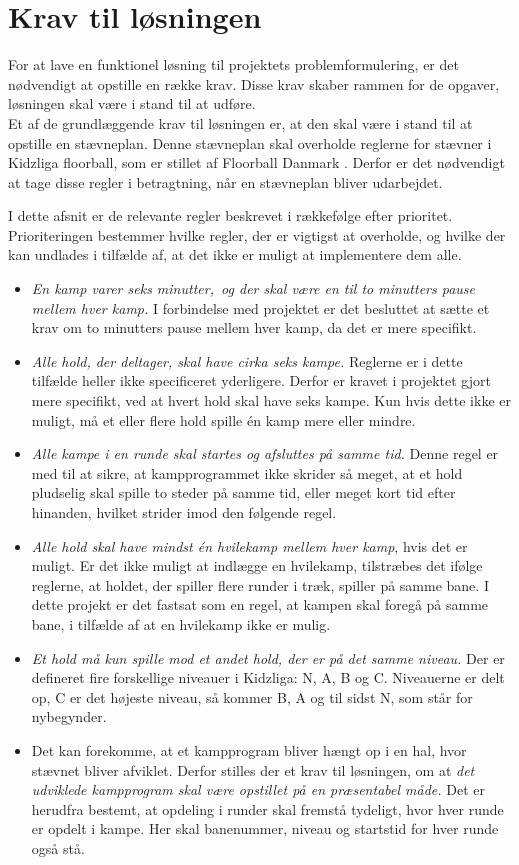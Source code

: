 \section{Krav til løsningen}
For at lave en funktionel løsning til projektets problemformulering, er det nødvendigt at opstille en række krav. Disse krav skaber rammen for de opgaver, løsningen skal være i stand til at udføre.\\
Et af de grundlæggende krav til løsningen er, at den skal være i stand til at opstille en stævneplan. Denne stævneplan skal overholde reglerne for stævner i Kidzliga floorball, som er stillet af Floorball Danmark \cite{kidzRegler}. Derfor er det nødvendigt at tage disse regler i betragtning, når en stævneplan bliver udarbejdet.
\par
I dette afsnit er de relevante regler beskrevet i rækkefølge efter prioritet. Prioriteringen bestemmer hvilke regler, der er vigtigst at overholde, og hvilke der kan undlades i tilfælde af, at det ikke er muligt at implementere dem alle.
\begin{itemize}
    \item \textit{En kamp varer seks minutter,\ og der skal være en til to minutters pause mellem hver kamp.} I forbindelse med projektet er det besluttet at sætte et krav om to minutters pause mellem hver kamp, da det er mere specifikt.
    \item \textit{Alle hold, der deltager, skal have cirka seks kampe.} Reglerne er i dette tilfælde heller ikke specificeret yderligere. Derfor er kravet i projektet gjort mere specifikt, ved at hvert hold skal have seks kampe. Kun hvis dette ikke er muligt, må et eller flere hold spille én kamp mere eller mindre. 
    \item \textit{Alle kampe i en runde skal startes og afsluttes på samme tid.} Denne regel er med til at sikre, at kampprogrammet ikke skrider så meget, at et hold pludselig skal spille to steder på samme tid, eller meget kort tid efter hinanden, hvilket strider imod den følgende regel.
    \item \textit{Alle hold skal have mindst én hvilekamp mellem hver kamp}, hvis det er muligt. Er det ikke muligt at indlægge en hvilekamp, tilstræbes det ifølge reglerne, at holdet, der spiller flere runder i træk, spiller på samme bane. I dette projekt er det fastsat som en regel, at kampen skal foregå på samme bane, i tilfælde af at en hvilekamp ikke er mulig. 
    \item \textit{Et hold må kun spille mod et andet hold, der er på det samme niveau.} Der er defineret fire forskellige niveauer i Kidzliga: N, A, B og C. Niveauerne er delt op, C er det højeste niveau, så kommer B, A og til sidst N, som står for nybegynder. 
    \item Det kan forekomme, at et kampprogram bliver hængt op i en hal, hvor stævnet bliver afviklet. Derfor stilles der et krav til løsningen, om at \textit{det udviklede kampprogram skal være opstillet på en præsentabel måde.} Det er herudfra bestemt, at opdeling i runder skal fremstå tydeligt, hvor hver runde er opdelt i kampe. Her skal banenummer, niveau og startstid for hver runde også stå.
\end{itemize} 

